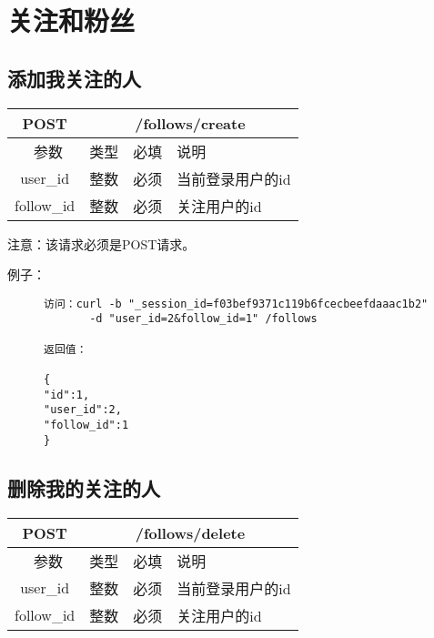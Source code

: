 \section{关注和粉丝}
\subsection{添加我关注的人}

\begin{table}[H]
   \begin{center}
\begin{tabular}{|c|c|c|p{12cm}|}
\hline
POST & \multicolumn{3}{|c|}{/follows/create} \\
\hline\hline
 \  参数  & 类型 & 必填 &  说明  \\
\hline
 user\_id  & 整数 & 必须 &  当前登录用户的id\\
\hline
 follow\_id  & 整数 & 必须 &  关注用户的id\\
\hline
\end{tabular}
   \end{center}
\end{table}

注意：该请求必须是POST请求。

例子：

\begin{figure}[H]
\begin{verbatim}
访问：curl -b "_session_id=f03bef9371c119b6fcecbeefdaaac1b2"
       -d "user_id=2&follow_id=1" /follows

返回值：

{
"id":1,
"user_id":2,
"follow_id":1
}

\end{verbatim}
\end{figure}



\subsection{删除我的关注的人}

\begin{table}[H]
   \begin{center}
\begin{tabular}{|c|c|c|p{12cm}|}
\hline
POST & \multicolumn{3}{|c|}{/follows/delete} \\
\hline\hline
 \  参数  & 类型 & 必填 &  说明  \\
\hline
 user\_id  & 整数 & 必须 &  当前登录用户的id\\
\hline
 follow\_id  & 整数 & 必须 &  关注用户的id\\
\hline
\end{tabular}
   \end{center}
\end{table}

